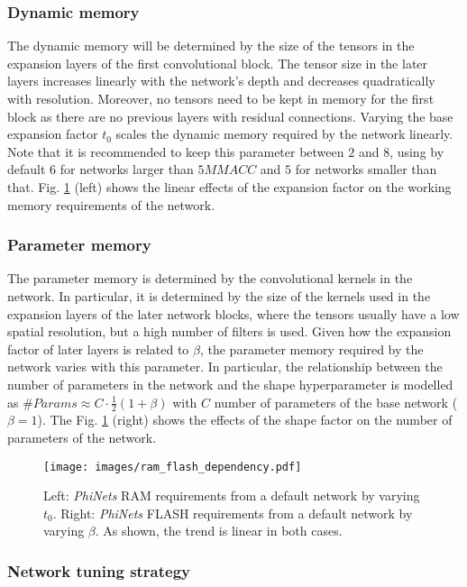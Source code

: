 \subsubsection{Dynamic memory}
The dynamic memory will be determined by the size of the tensors in the expansion layers of the first convolutional block. The tensor size in the later layers increases linearly with the network's depth and decreases quadratically with resolution. Moreover, no tensors need to be kept in memory for the first block as there are no previous layers with residual connections. Varying the base expansion factor $t_0$  scales the dynamic memory required by the network linearly. Note that it is recommended to keep this parameter between $2$ and $8$, using by default $6$ for networks larger than $5MMACC$ and $5$ for networks smaller than that. Fig. \ref{fig:ram_flash_dependency} (left) shows the linear effects of the expansion factor on the working memory requirements of the network.

\subsubsection{Parameter memory}
The parameter memory is determined by the convolutional kernels in the network. In particular, it is determined by the size of the kernels used in the expansion layers of the later network blocks, where the tensors usually have a low spatial resolution, but a high number of filters is used. Given how the expansion factor of later layers is related to $\beta$, the parameter memory required by the network varies with this parameter. In particular, the relationship between the number of parameters in the network and the shape hyperparameter is modelled as $\#Params \approx C\cdot \frac{1}{2}(1+\beta)$ with $C$ number of parameters of the base network ($\beta=1$). The Fig. \ref{fig:ram_flash_dependency} (right) shows the effects of the shape factor on the number of parameters of the network.

\begin{figure}[H]
  \centering
  \texttt{[image: images/ram\_flash\_dependency.pdf]}
  \caption{ Left: \textit{PhiNets} RAM requirements from a default network by varying $t_0$. Right: \textit{PhiNets} FLASH requirements from a default network by varying $\beta$. As shown, the trend is linear in both cases.}
  \label{fig:ram_flash_dependency}
\end{figure}

\subsubsection{Network tuning strategy}


